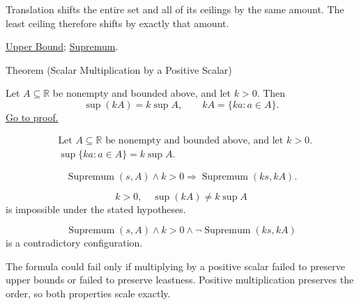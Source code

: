 \begin{remark*}[Interpretation]
Translation shifts the entire set and all of its ceilings by the same amount. The least ceiling therefore shifts by exactly that amount.
\end{remark*}

\begin{dependencies}
\hyperref[def:upper-bound]{Upper Bound};
\hyperref[def:supremum]{Supremum}.
\end{dependencies}



\begin{theorembox}{Theorem (Scalar Multiplication by a Positive Scalar)}
\begin{theorem}
\label{thm:scalar-mult-positive}
Let $A\subseteq\mathbb{R}$ be nonempty and bounded above, and let $k>0$. Then
\[
  \sup(kA)=k\sup A,
  \qquad
  kA=\{ka:a\in A\}.
\]
\hyperref[prf:scalar-mult-positive]{Go to proof.}
\end{theorem}
\end{theorembox}

\begin{remark*}
\[
\begin{aligned}
&\text{Let }A\subseteq\mathbb{R}\text{ be nonempty and bounded above, and let }k>0.\\
&\sup\{ka:a\in A\}=k\sup A.
\end{aligned}
\]
\end{remark*}

\begin{remark*}
\[
\operatorname{Supremum}(s,A)\land k>0
\Longrightarrow
\operatorname{Supremum}(ks,kA).
\]
\end{remark*}

\begin{remark*}
\[
k>0,\quad \sup(kA)\ne k\sup A
\]
is impossible under the stated hypotheses.
\end{remark*}

\begin{remark*}
\[
\operatorname{Supremum}(s,A)\land k>0\land \neg\operatorname{Supremum}(ks,kA)
\]
is a contradictory configuration.
\end{remark*}

\begin{remark*}
The formula could fail only if multiplying by a positive scalar failed to preserve upper bounds or failed to preserve leastness. Positive multiplication preserves the order, so both properties scale exactly.
\end{remark*}

